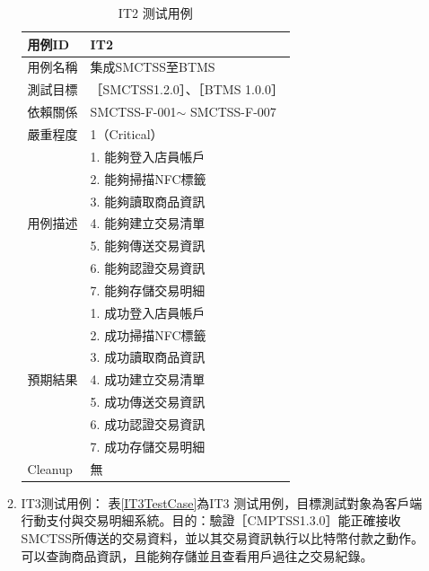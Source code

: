 \begin{enumerate}
\begin{enumerate}
						\begin{table}[!htbp]
						\caption{IT2 测试用例} %
						\centering %
						\label{IT2TestCase} %
						\begin{tabular}{|l|l|}
						\hline
						用例ID & IT2 \\ \hline
						用例名稱 & 集成SMCTSS至BTMS \\ \hline
						測試目標 & {［}SMCTSS1.2.0{］}、{［}BTMS 1.0.0{］} \\ \hline
						依賴關係 & SMCTSS-F-001$\sim$ SMCTSS-F-007 \\ \hline
						嚴重程度 & 1（Critical） \\ \hline
						\multirow{7}{*}{用例描述} & 1.     能夠登入店員帳戶 \\ \cline{2-2} 
						 & 2.     能夠掃描NFC標籤 \\ \cline{2-2} 
						 & 3.     能夠讀取商品資訊 \\ \cline{2-2} 
						 & 4.     能夠建立交易清單 \\ \cline{2-2} 
						 & 5.     能夠傳送交易資訊 \\ \cline{2-2} 
						 & 6.     能夠認證交易資訊 \\ \cline{2-2} 
						 & 7.     能夠存儲交易明細 \\ \hline
						\multirow{7}{*}{預期結果} & 1.     成功登入店員帳戶 \\ \cline{2-2} 
						 & 2.     成功掃描NFC標籤 \\ \cline{2-2} 
						 & 3.     成功讀取商品資訊 \\ \cline{2-2} 
						 & 4.     成功建立交易清單 \\ \cline{2-2} 
						 & 5.     成功傳送交易資訊 \\ \cline{2-2} 
						 & 6.     成功認證交易資訊 \\ \cline{2-2} 
						 & 7.     成功存儲交易明細 \\ \hline
						Cleanup & 無 \\ \hline
						\end{tabular}
						\end{table}

				\item IT3测试用例：
					表\ref{IT3TestCase}為IT3 测试用例，目標測試對象為客戶端行動支付與交易明細系統。目的：驗證［CMPTSS1.3.0］能正確接收SMCTSS所傳送的交易資料，並以其交易資訊執行以比特幣付款之動作。可以查詢商品資訊，且能夠存儲並且查看用戶過往之交易紀錄。


\end{enumerate}
\end{enumerate}
